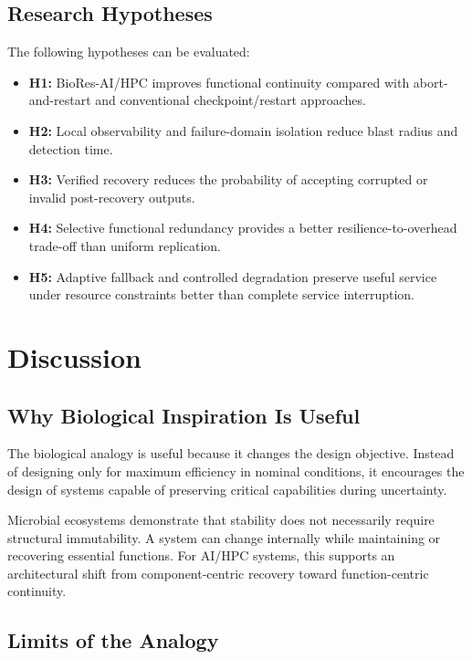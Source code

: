 \documentclass[conference]{IEEEtran}
\begin{document}
\subsection{Research Hypotheses}

The following hypotheses can be evaluated:
\begin{itemize}
    \item \textbf{H1:} BioRes-AI/HPC improves functional continuity compared with abort-and-restart and conventional checkpoint/restart approaches.
    \item \textbf{H2:} Local observability and failure-domain isolation reduce blast radius and detection time.
    \item \textbf{H3:} Verified recovery reduces the probability of accepting corrupted or invalid post-recovery outputs.
    \item \textbf{H4:} Selective functional redundancy provides a better resilience-to-overhead trade-off than uniform replication.
    \item \textbf{H5:} Adaptive fallback and controlled degradation preserve useful service under resource constraints better than complete service interruption.
\end{itemize}

\section{Discussion}

\subsection{Why Biological Inspiration Is Useful}

The biological analogy is useful because it changes the design objective. Instead of designing only for maximum efficiency in nominal conditions, it encourages the design of systems capable of preserving critical capabilities during uncertainty.

Microbial ecosystems demonstrate that stability does not necessarily require structural immutability. A system can change internally while maintaining or recovering essential functions. For AI/HPC systems, this supports an architectural shift from component-centric recovery toward function-centric continuity.

\subsection{Limits of the Analogy}
\end{document}
